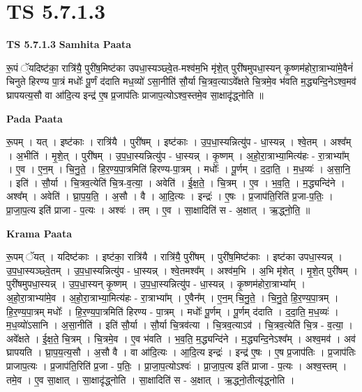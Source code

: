 \documentclass[17pt]{extarticle}
\begin{document}
\section{ TS 5.7.1.3 }

\textbf{TS 5.7.1.3 } \newline
\textbf{Samhita Paata} \newline

रू॒पं ॅयदिष्ट॑का॒ रात्रि॑यै॒ पुरी॑ष॒मिष्ट॑का उपधा॒स्यञ्छ्वे॒त-मश्व॑म॒भि मृ॑शे॒त् पुरी॑षमुपधा॒स्यन् कृ॒ष्णम॑होरा॒त्राभ्या॑मे॒वैनं॑ चिनुते हिरण्य पा॒त्रं मधोः᳚ पू॒र्णं द॑दाति मध॒व्यो॑ ऽसा॒नीति॑ सौ॒र्या चि॒त्रव॒त्याऽवे᳚क्षते चि॒त्रमे॒व भ॑वति म॒द्ध्यन्दि॒नेऽश्व॒मव॑ घ्रापयत्य॒सौ वा आ॑दि॒त्य इन्द्र॑ ए॒ष प्र॒जाप॑तिः प्राजाप॒त्योऽश्व॒स्तमे॒व सा॒क्षादृ॑द्ध्नोति ॥ \newline

\textbf{Pada Paata} \newline

रू॒पम् । यत् । इष्ट॑काः । रात्रि॑यै । पुरी॑षम् । इष्ट॑काः । उ॒प॒धा॒स्यन्नित्यु॑प - धा॒स्यन्न् । श्वे॒तम् । अश्व᳚म् । अ॒भीति॑ । मृ॒शे॒त् । पुरी॑षम् । उ॒प॒धा॒स्यन्नित्यु॑प - धा॒स्यन्न् । कृ॒ष्णम् । अ॒हो॒रा॒त्राभ्या॒मित्य॑हः - रा॒त्राभ्या᳚म् । ए॒व । ए॒न॒म् । चि॒नु॒ते॒ । हि॒र॒ण्य॒पा॒त्रमिति॑ हिरण्य-पा॒त्रम् । मधोः᳚ । पू॒र्णम् । द॒दा॒ति॒ । म॒ध॒व्यः॑ । अ॒सा॒नि॒ । इति॑ । सौ॒र्या । चि॒त्रव॒त्येति॑ चि॒त्र-व॒त्या॒ । अवेति॑ । ई॒क्ष॒ते॒ । चि॒त्रम् । ए॒व । भ॒व॒ति॒ । म॒द्ध्यन्दि॑ने । अश्व᳚म् । अवेति॑ । घ्रा॒प॒य॒ति॒ । अ॒सौ । वै । आ॒दि॒त्यः । इन्द्रः॑ । ए॒षः । प्र॒जाप॑ति॒रिति॑ प्र॒जा-प॒तिः॒ । प्रा॒जा॒प॒त्य इति॑ प्राजा - प॒त्यः । अश्वः॑ । तम् । ए॒व । सा॒क्षादिति॑ स - अ॒क्षात् । ऋ॒द्ध्नो॒ति॒ ॥  \newline


\textbf{Krama Paata} \newline

रू॒पम् ॅयत् । यदिष्ट॑काः । इष्ट॑का॒ रात्रि॑यै । रात्रि॑यै॒ पुरी॑षम् । पुरी॑ष॒मिष्ट॑काः । इष्ट॑का उपधा॒स्यन्न् । उ॒प॒धा॒स्यञ्छ्वे॒तम् । उ॒प॒धा॒स्यन्नित्यु॑प - धा॒स्यन्न् । श्वे॒तमश्व᳚म् । अश्व॑म॒भि । अ॒भि मृ॑शेत् । मृ॒शे॒त् पुरी॑षम् । पुरी॑षमुपधा॒स्यन्न् । उ॒प॒धा॒स्यन् कृ॒ष्णम् । उ॒प॒धा॒स्यन्नित्यु॑प - धा॒स्यन्न् । कृ॒ष्णम॑होरा॒त्राभ्या᳚म् । अ॒हो॒रा॒त्राभ्या॑मे॒व । अ॒हो॒रा॒त्राभ्या॒मित्य॑हः - रा॒त्राभ्या᳚म् । ए॒वैन᳚म् । ए॒न॒म् चि॒नु॒ते॒ । चि॒नु॒ते॒ हि॒र॒ण्य॒पा॒त्रम् । हि॒र॒ण्य॒पा॒त्रम् मधोः᳚ । हि॒र॒ण्य॒पा॒त्रमिति॑ हिरण्य - पा॒त्रम् । मधोः᳚ पू॒र्णम् । पू॒र्णम् द॑दाति । द॒दा॒ति॒ म॒ध॒व्यः॑ । म॒ध॒व्यो॑ऽसानि । अ॒सा॒नीति॑ । इति॑ सौ॒र्या । सौ॒र्या चि॒त्रव॑त्या । चि॒त्रव॒त्याऽव॑ । चि॒त्रव॒त्येति॑ चि॒त्र - व॒त्या॒ । अवे᳚क्षते । ई॒क्ष॒ते॒ चि॒त्रम् । चि॒त्रमे॒व । ए॒व भ॑वति । भ॒व॒ति॒ म॒द्ध्यन्दि॑ने । म॒द्ध्यन्दि॒नेऽश्व᳚म् । अश्व॒मव॑ । अव॑ घ्रापयति । घ्रा॒प॒य॒त्य॒सौ । अ॒सौ वै । वा आ॑दि॒त्यः । आ॒दि॒त्य इन्द्रः॑ । इन्द्र॑ ए॒षः । ए॒ष प्र॒जाप॑तिः । प्र॒जाप॑तिः प्राजाप॒त्यः । प्र॒जाप॑ति॒रिति॑ प्र॒जा - प॒तिः॒ । प्रा॒जा॒प॒त्योऽश्वः॑ । प्रा॒जा॒प॒त्य इति॑ प्राजा - प॒त्यः । अश्व॒स्तम् । तमे॒व । ए॒व सा॒क्षात् । सा॒क्षादृ॑द्ध्नोति । सा॒क्षादिति॑ स - अ॒क्षात् । ऋ॒द्ध्नो॒तीत्यृ॑द्ध्नोति । \newline
\end{document}
